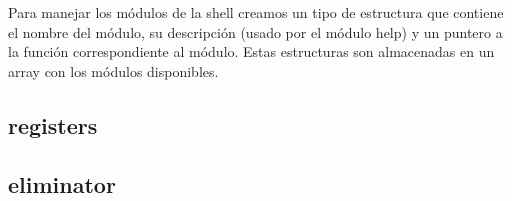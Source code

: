 \documentclass{article}
\begin{document}
Para manejar los módulos de la shell creamos un tipo de estructura que contiene el nombre del módulo, su descripción (usado por el módulo help) y un puntero a la función correspondiente al módulo. Estas estructuras son almacenadas en un array con los módulos disponibles.

\subsection {registers}
\subsection {eliminator}
\end{document}
